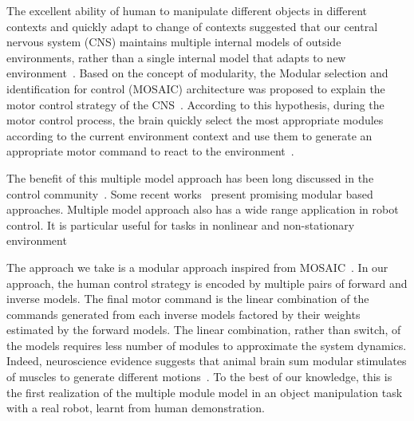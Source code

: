The excellent ability of human to manipulate different objects in different contexts and quickly adapt to change of contexts suggested that our central nervous system (CNS) maintains multiple internal models of outside environments, rather than a single internal model that adapts to new environment~\cite{neilson1985acquisition}. Based on the concept of modularity, the Modular selection and identification for control (MOSAIC) architecture was proposed to explain the motor control strategy of the CNS~\cite{wolpert1998multiple}. According to this hypothesis, during the motor control process, the brain quickly select the most appropriate modules according to the current environment context and use them to generate an appropriate motor command to react to the environment~\cite{haruno2001mosaic}.

The benefit of this multiple model approach has been long discussed in the control community~\cite{jacobs1991adaptive,narendra1995adaptation,narendra1997adaptive}. Some recent works~\cite{fekri2007robust,kuipers2010multiple} present promising modular based approaches. Multiple model approach also has a wide range application in robot control. It is particular useful for tasks in nonlinear and non-stationary environment~\cite{petkos2006learning,sugimoto2012emosaic}


The approach we take is a modular approach inspired from MOSAIC~\cite{haruno2001mosaic}. In our approach, the human control strategy is encoded by multiple pairs of forward and inverse models. The final motor command is the linear combination of the commands generated from each inverse models factored by their weights estimated by the forward models. The linear combination, rather than switch, of the models requires less number of modules to approximate the system dynamics. Indeed, neuroscience evidence suggests that animal brain sum modular stimulates of muscles to generate different motions~\cite{mussa1994linear}. To the best of our knowledge, this is the first realization of the multiple module model in an object manipulation task with a real robot, learnt from human demonstration.

%
%
%

